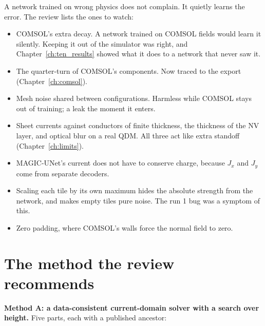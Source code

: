 A network trained on wrong physics does not complain. It quietly learns the error. The review lists the ones to watch:
\begin{itemize}
\item COMSOL's extra decay. A network trained on COMSOL fields would learn it silently. Keeping it out of the simulator
was right, and Chapter~\ref{ch:ten_results} showed what it does to a network that never saw it.
\item The quarter-turn of COMSOL's components. Now traced to the export (Chapter~\ref{ch:comsol}).
\item Mesh noise shared between configurations. Harmless while COMSOL stays out of training; a leak the moment it enters.
\item Sheet currents against conductors of finite thickness, the thickness of the NV layer, and optical blur on a real
QDM. All three act like extra standoff (Chapter~\ref{ch:limits}).
\item MAGIC-UNet's current does not have to conserve charge, because $J_x$ and $J_y$ come from separate decoders.
\item Scaling each tile by its own maximum hides the absolute strength from the network, and makes empty tiles pure
noise. The run 1 bug was a symptom of this.
\item Zero padding, where COMSOL's walls force the normal field to zero.
\end{itemize}

\section{The method the review recommends}

\textbf{Method A: a data-consistent current-domain solver with a search over height.} Five parts, each with a published
ancestor:

